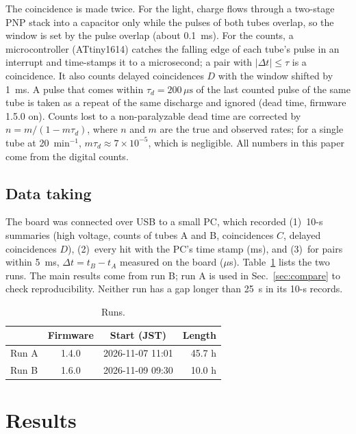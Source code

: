 \documentclass[aip,ajp,amsmath,amssymb,reprint]{revtex4-2}
\newcommand{\us}{\,\mu\mathrm{s}}
\begin{document}
The coincidence is made twice. For the light, charge flows through a two-stage PNP stack into a capacitor only while the pulses of both tubes overlap, so the window is set by the pulse overlap (about 0.1~ms). For the counts, a microcontroller (ATtiny1614) catches the falling edge of each tube's pulse in an interrupt and time-stamps it to a microsecond; a pair with $|\Delta t| \le \tau$ is a coincidence. It also counts delayed coincidences $D$ with the window shifted by 1~ms. A pulse that comes within $\tau_d = 200\us$ of the last counted pulse of the same tube is taken as a repeat of the same discharge and ignored (dead time, firmware 1.5.0 on). Counts lost to a non-paralyzable dead time are corrected by $n = m/(1 - m\tau_d)$, where $n$ and $m$ are the true and observed rates;\cite{knoll} for a single tube at 20~min$^{-1}$, $m\tau_d \approx 7\times10^{-5}$, which is negligible. All numbers in this paper come from the digital counts.

\subsection{Data taking}

The board was connected over USB to a small PC, which recorded (1)~10-s summaries (high voltage, counts of tubes A and B, coincidences $C$, delayed coincidences $D$), (2)~every hit with the PC's time stamp (ms), and (3)~for pairs within 5~ms, $\Delta t = t_B - t_A$ measured on the board ($\mu$s). Table~\ref{tab:runs} lists the two runs. The main results come from run B; run A is used in Sec.~\ref{sec:compare} to check reproducibility. Neither run has a gap longer than 25~s in its 10-s records.

\begin{table}[t]
\caption{Runs.}
\label{tab:runs}
\begin{ruledtabular}
\begin{tabular}{lccr}
 & Firmware & Start (JST) & Length \\
\hline
Run A & 1.4.0 & 2026-11-07 11:01 & 45.7 h \\
Run B & 1.6.0 & 2026-11-09 09:30 & 10.0 h \\
\end{tabular}
\end{ruledtabular}
\end{table}

\section{Results}
\end{document}
